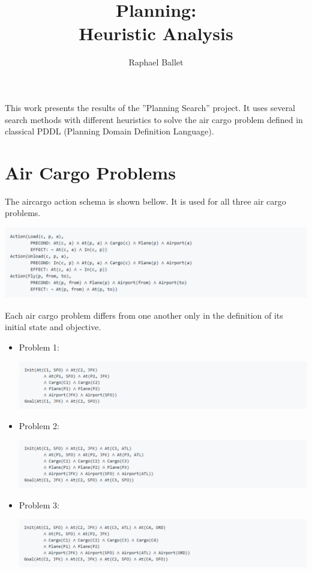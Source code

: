 \documentclass[12pt, a4paper]{article}
\title{Planning: \\Heuristic Analysis}
\author{Raphael Ballet}
\date{}
\begin{document}
	\maketitle
	
	This work presents the results of the ''Planning Search'' project. It uses several search methods with different heuristics to solve the air cargo problem defined in classical PDDL (Planning Domain Definition Language).
	
	\section{Air Cargo Problems}
	
	The aircargo action schema is shown bellow. It is used for all three air cargo problems.
	
\begin{center}
	\includegraphics[width=1\linewidth]{action_schema}
\end{center}

	Each air cargo problem differs from one another only in the definition of its initial state and objective.
	
	\begin{itemize}
		\item Problem 1:
		\begin{center}
			\includegraphics[width=1\linewidth]{problem_1}
		\end{center}
	\pagebreak
		\item Problem 2:
		\begin{center}
			\includegraphics[width=1\linewidth]{problem_2}
		\end{center}
		\item Problem 3:
		\begin{center}
			\includegraphics[width=1\linewidth]{problem_3}
		\end{center}
	\end{itemize}
	
\end{document}
